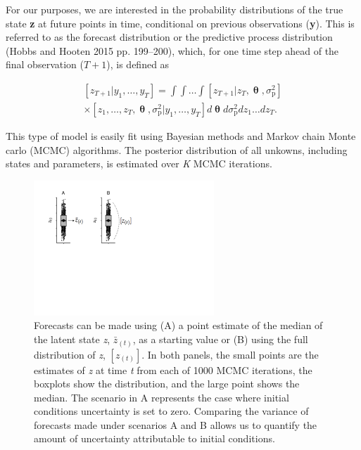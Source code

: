 \documentclass[12pt,]{article}
\begin{document}
For our purposes, we are interested in the probability distributions of
the true state \textbf{z} at future points in time, conditional on
previous observations (\textbf{y}). This is referred to as the forecast
distribution or the predictive process distribution (Hobbs and Hooten
2015 pp. 199--200), which, for one time step ahead of the final
observation (\(T+1\)), is defined as

\begin{equation}
\begin{gathered}
\left[z_{T+1} | y_1,\dots,y_T \right] = \int \int \dots \int \left[z_{T+1} | z_T,\bm{\uptheta}, \sigma^2_{\text{p}} \right] \\ \times \left[z_1,\dots,z_T,\bm{\uptheta}, \sigma^2_{\text{p}} | y_1,\dots,y_T \right] d\bm{\uptheta} d\sigma^2_{\text{p}} dz_1 \dots dz_T.
\end{gathered}
\end{equation}

This type of model is easily fit using Bayesian methods and Markov chain
Monte carlo (MCMC) algorithms. The posterior distribution of all
unkowns, including states and parameters, is estimated over \emph{K}
MCMC iterations.

\begin{figure}
\centering
\includegraphics[width=\textwidth,height=2in]{../figures/init_cond_example.pdf}
\caption{Forecasts can be made using (A) a point estimate of the median
of the latent state \emph{z}, \(\bar{z}_{(t)}\), as a starting value or
(B) using the full distribution of \emph{z}, \([z_{(t)}]\). In both
panels, the small points are the estimates of \emph{z} at time \emph{t}
from each of 1000 MCMC iterations, the boxplots show the distribution,
and the large point shows the median. The scenario in A represents the
case where initial conditions uncertainty is set to zero. Comparing the
variance of forecasts made under scenarios A and B allows us to quantify
the amount of uncertainty attributable to initial conditions.}
\end{figure}
\end{document}
